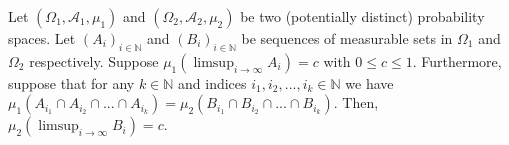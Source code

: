 \documentclass[12pt]{article}
\begin{document}
\begin{theorem} \label{fix everything}
     Let $(\Omega_1, \mathscr{A}_1, \mu_1)$ and  $(\Omega_2, \mathscr{A}_2, \mu_2)$ be two (potentially distinct) probability spaces. Let $(A_i)_{i\in \mathbb{N}}$ and $(B_i)_{i\in \mathbb{N}}$ be sequences of measurable sets in $\Omega_1$ and $\Omega_2$ respectively. Suppose $\mu_1(\limsup_{i \rightarrow \infty} A_i)=c$ with $0 \leq c \leq 1$. 
     Furthermore, suppose that for any $k \in \mathbb{N}$ and indices $i_1,i_2,...,i_k \in \mathbb{N}$ we have $\mu_1 (A_{i_1} \cap A_{i_2} \cap ... \cap A_{i_k})=\mu_2 (B_{i_1} \cap B_{i_2} \cap ... \cap B_{i_k})$.
     Then, $\mu_2 (\limsup_{i \rightarrow \infty} B_i)=c$.
\end{theorem}
 

    
\end{document}
